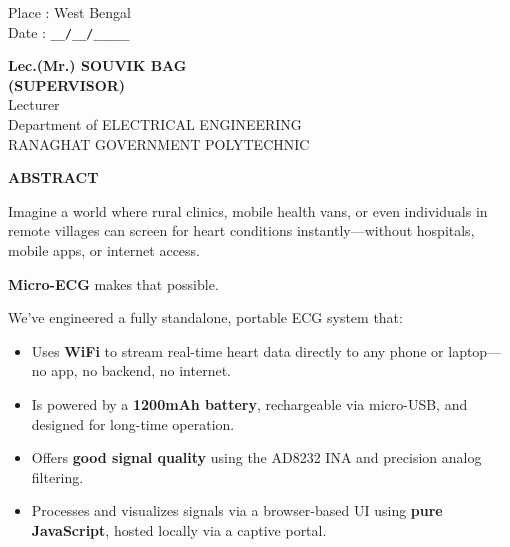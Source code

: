 \documentclass[12pt,a4paper]{report}
\begin{document}
\noindent \begin{minipage}{4cm}
\begin{flushleft}
\vspace{1 cm}
                         
Place : West Bengal \\
Date : \verb|__/__/_____|\\

\end{flushleft} 
\end{minipage}
\hfill
\begin{minipage}{10cm}
\begin{flushright}                                      
\vspace{2cm}
                         

\vspace{.8cm}
\textbf{Lec.(Mr.) SOUVIK BAG}\\
\textbf{(SUPERVISOR)}\\
Lecturer\\
Department of ELECTRICAL ENGINEERING \\
RANAGHAT GOVERNMENT POLYTECHNIC\\
\end{flushright} 
\end{minipage}

\newpage




\begin{center}
 \textbf{ABSTRACT}
\end{center}


\noindent
Imagine a world where rural clinics, mobile health vans, or even individuals in remote villages can screen for heart conditions instantly—without hospitals, mobile apps, or internet access.

\textbf{Micro-ECG} makes that possible.

We’ve engineered a fully standalone, portable ECG system that:
\begin{itemize}
    \item Uses \textbf{WiFi} to stream real-time heart data directly to any phone or laptop—no app, no backend, no internet.
    \item Is powered by a \textbf{1200mAh battery}, rechargeable via micro-USB, and designed for long-time operation.
    \item Offers \textbf{good signal quality} using the AD8232 INA and precision analog filtering.
    \item Processes and visualizes signals via a browser-based UI using \textbf{pure JavaScript}, hosted locally via a captive portal.
\end{itemize}
\end{document}
